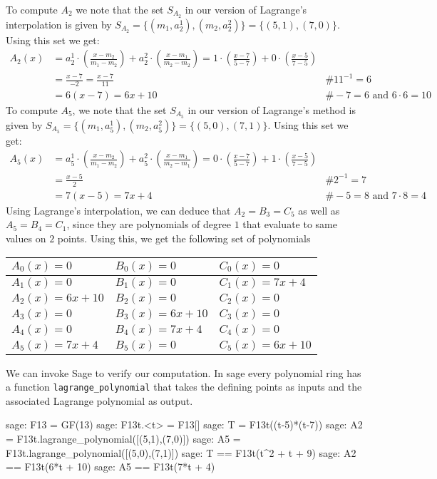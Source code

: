 \begin{example}
To compute $A_2$ we note that the set $S_{A_2}$ in our version of Lagrange's interpolation  is given by $S_{A_2}=\{(m_1,a^1_2), (m_2,a_2^2)\} = \{(5,1), (7,0)\}$. Using this set we get:
\begin{align*}
A_2(x) & = a^1_2\cdot(\frac{x-m_2}{m_1-m_2}) + a^2_2\cdot(\frac{x-m_1}{m_2-m_2})
      = 1\cdot(\frac{x-7}{5-7}) + 0\cdot(\frac{x-5}{7-5}) \\
    & = \frac{x-7}{-2}
      = \frac{x-7}{11} & \text{\# } 11^{-1}=6 \\
    & = 6(x-7) 
      = 6x + 10 & \text{\# } -7 = 6 \text{ and } 6\cdot 6 = 10
\end{align*}
To compute $A_5$, we note that the set $S_{A_5}$ in our version of Lagrange's method  is given by $S_{A_5}=\{(m_1,a^1_5), (m_2,a^2_5)\} = \{(5,0), (7,1)\}$. Using this set we get:
\begin{align*}
A_5(x) & = a^1_5\cdot(\frac{x-m_2}{m_1-m_2}) + a^2_5\cdot(\frac{x-m_1}{m_2-m_1})
      = 0\cdot(\frac{x-7}{5-7}) + 1\cdot(\frac{x-5}{7-5}) \\
    & = \frac{x-5}{2} & \text{\# } 2^{-1}=7 \\
    & = 7(x-5) 
      = 7x + 4 & \text{\# } -5 = 8 \text{ and } 7\cdot 8 = 4
\end{align*}
Using Lagrange's interpolation, we can deduce that $A_2=B_3=C_5$ as well as $A_5=B_4=C_1$, since they are polynomials of degree $1$ that evaluate to same values on $2$ points. Using this, we get the following set of polynomials
\begin{center}
\begin{tabular}{|l|l|l|}\hline 
$A_{0}(x)=0 $ &$ B_{0}(x)=0   $ & $C_{0}(x)=0$ \tabularnewline\hline 
$A_1(x)=0 $ &$ B_1(x)=0   $ & $C_1(x)=7x+4$ \tabularnewline\hline 
$A_2(x)=6x+10$ &$ B_2(x)=0$ & $C_2(x)=0$ \tabularnewline\hline 
$A_3(x)=0    $ &$ B_3(x)=6x+10$ & $C_3(x)=0$ \tabularnewline\hline 
$A_4(x)=0$ &$ B_4(x)=7x+4  $ & $C_4(x)=0$ \tabularnewline\hline 
$A_5(x)=7x+4$ &$ B_5(x)=0      $ & $C_5(x)=6x+10$ \tabularnewline\hline 
\end{tabular}
\end{center}
We can invoke Sage to verify our computation. In sage every polynomial ring has a function \texttt{lagrange\_polynomial} that takes the defining points as inputs and the associated Lagrange polynomial as output.
\begin{sagecommandline}
sage: F13 = GF(13)
sage: F13t.<t> = F13[]
sage: T = F13t((t-5)*(t-7))
sage: A2 = F13t.lagrange_polynomial([(5,1),(7,0)])
sage: A5 = F13t.lagrange_polynomial([(5,0),(7,1)])
sage: T == F13t(t^2 + t + 9)
sage: A2 == F13t(6*t + 10)
sage: A5 == F13t(7*t + 4)
\end{sagecommandline}


\end{example}
